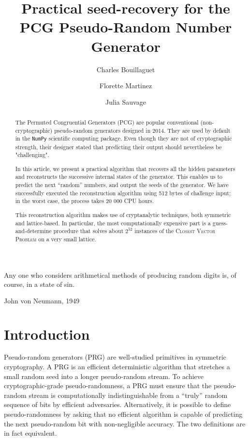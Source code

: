 \documentclass[journal=tosc,final]{iacrtrans}
\title{Practical seed-recovery for the PCG Pseudo-Random Number Generator}
\author{Charles Bouillaguet\inst{1} \and Florette Martinez\inst{2} \and Julia Sauvage\inst{3}}
\institute{%
Univ. Lille, CNRS, Centrale Lille, UMR 9189 - CRIStAL - Centre de Recherche en Informatique Signal et Automatique de Lille, F-59000 Lille, France \\ 
\email{charles.bouillaguet@univ-lille.fr}
\and 
Sorbonne Université, CNRS, LIP6, F-75005 Paris, France \\
\email{florette.martinez@lip6.fr}
\and 
Sorbonne Université, F-75005 Paris, France \\
\email{julia.sauvage@etu.upmc.fr}
}
\begin{document}

\maketitle


\begin{abstract}
  The Permuted Congruential Generators (\textsf{PCG}) are popular conventional
  (non-cryptographic) pseudo-random generators designed in 2014. They are used
  by default in the \texttt{NumPy} scientific computing package. Even though
  they are not of cryptographic strength, their designer stated that predicting
  their output should nevertheless be "challenging".

  In this article, we present a practical algorithm that recovers all the hidden
  parameters and reconstructs the successive internal states of the
  generator. This enables us to predict the next ``random'' numbers, and output
  the seeds of the generator. We have successfully executed the reconstruction
  algorithm using 512 bytes of challenge input; in the worst case, the process
  takes 20 000 CPU hours.

  This reconstruction algorithm makes use of cryptanalytic techniques, both
  symmetric and lattice-based. In particular, the most computationally expensive
  part is a guess-and-determine procedure that solves about $2^{52}$ instances
  of the \textsc{Closest Vector Problem} on a very small lattice.
\end{abstract}


\epigraph{Any one who considers arithmetical methods of producing random digits is, of course, in a state of sin.}{John von Neumann, 1949}

\section{Introduction} 

Pseudo-random generators (PRG) are well-studied primitives in symmetric
cryptography. A PRG is an efficient deterministic algorithm that stretches a small
random seed into a longer pseudo-random stream. To achieve cryptographic-grade
pseudo-randomness, a PRG must ensure that the pseudo-random stream is
computationally indistinguishable from a ``truly'' random sequence of bits by
efficient adversaries. Alternatively, it is possible to define pseudo-randomness
by asking that no efficient algorithm is capable of predicting the next
pseudo-random bit with non-negligible accuracy. The two definitions are in fact
equivalent.
\end{document}

